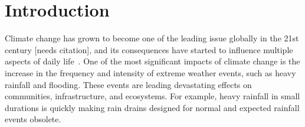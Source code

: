 \section{Introduction}

Climate change has grown to become one of the leading issue globally in the 21st century [needs citation], and its consequences have started to influence multiple aspects of daily life~\cite{lelieveld2012climate}. One of the most significant impacts of climate change is the increase in the frequency and intensity of extreme weather events, such as heavy rainfall and flooding. These events are leading devastating effects on communities, infrastructure, and ecosystems. For example, heavy rainfall in small durations is quickly making rain drains designed for normal and expected rainfall events obsolete.